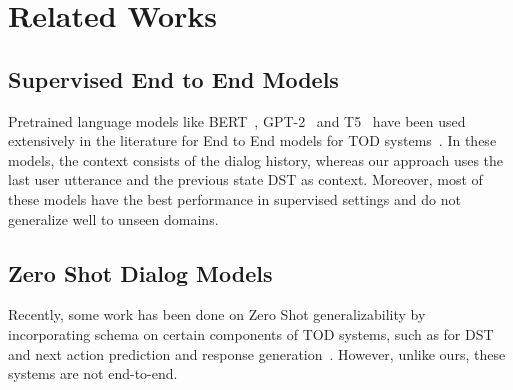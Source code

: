 \section{Related Works}

\subsection{Supervised End to End Models}
Pretrained language models like BERT~\cite{Devlin2019BERTPO}, GPT-2~\cite{Radford2019LanguageMA} and T5~\cite{Raffel2019ExploringTL}
have been used extensively in the literature for End to End models for TOD systems~\cite{HosseiniAsl2020ASL,Peng2021SoloistBT,Lee2020SUMBTLaRLEN,Yang2020UBARTF,Jeon2021DORATP,Sun2022BORTBA,Yang2022UBARv2TM,Noroozi2020AFA}.
In these models, the context consists of the dialog history, whereas our approach uses the last user utterance and the previous state DST as context.
Moreover, most of these models have the best performance in supervised settings and do not generalize well to unseen domains.

\subsection{Zero Shot Dialog Models}

Recently, some work has been done on Zero Shot generalizability by incorporating schema on certain components of TOD systems,
such as for DST~\cite{Feng2020ASA,Feng2022DynamicSG,Lee2021DialogueST,Noroozi2020AFA,Wang2022SlotDM}
and next action prediction and response generation~\cite{Mosig2020STARAS,Mehri2021SchemaGuidedPF}.
However, unlike ours, these systems are not end-to-end.